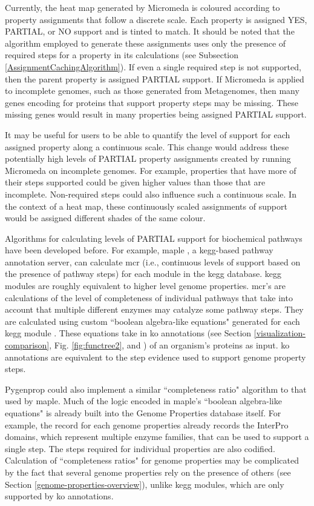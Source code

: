 Currently, the heat map generated by Micromeda is coloured according to property assignments that follow a discrete scale. Each property is assigned YES, PARTIAL, or NO support and is tinted to match. It should be noted that the algorithm employed to generate these assignments uses only the presence of required steps for a property in its calculations (see Subsection \ref{AssignmentCachingAlgorithm}). If even a single required step is not supported, then the parent property is assigned PARTIAL support. If Micromeda is applied to incomplete genomes, such as those generated from Metagenomes, then many genes encoding for proteins that support property steps may be missing. These missing genes would result in many properties being assigned PARTIAL support. 

It may be useful for users to be able to quantify the level of support for each assigned property along a continuous scale. This change would address these potentially high levels of PARTIAL property assignments created by running Micromeda on incomplete genomes. For example, properties that have more of their steps supported could be given higher values than those that are incomplete. Non-required steps could also influence such a continuous scale. In the context of a heat map, these continuously scaled assignments of support would be assigned different shades of the same colour.

Algorithms for calculating levels of PARTIAL support for biochemical pathways have been developed before. For example, \gls{maple} \cite{takami2016automated}, a \gls{kegg}-based pathway annotation server, can calculate \gls{mcr} (i.e., continuous levels of support based on the presence of pathway steps) for each module in the \gls{kegg}  database. \gls{kegg} modules are roughly equivalent to higher level genome properties. \gls{mcr}'s are calculations of the level of completeness of individual pathways that take into account that multiple different enzymes may catalyze some pathway steps. They are calculated using custom ``boolean algebra-like equations" generated for each \gls{kegg} module \cite{takami2012evaluation}. These equations take in \gls{ko} annotations (see Section \ref{visualization-comparison}, Fig. \ref{fig:functree2}, and \cite{mao2005automated}) of an organism's proteins as input. \gls{ko} annotations are equivalent to the step evidence used to support genome property steps. 

Pygenprop could also implement a similar ``completeness ratio" algorithm to that used by \gls{maple}. Much of the logic encoded in \gls{maple}'s ``boolean algebra-like equations" is already built into the Genome Properties database itself. For example, the record for each genome properties already records the InterPro domains, which represent multiple enzyme families, that can be used to support a single step. The steps required for individual properties are also codified. Calculation of ``completeness ratios" for genome properties may be complicated by the fact that several genome properties rely on the presence of others (see Section \ref{genome-properties-overview}), unlike \gls{kegg} modules, which are only supported by \gls{ko} annotations.

